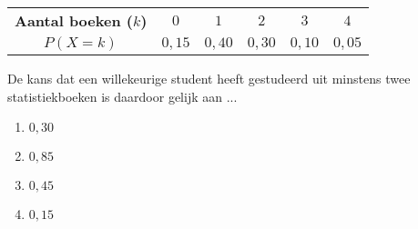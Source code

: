 
\begin{center}
    \begin{tabular}{cccccc}
        \toprule
            {\bfseries Aantal boeken ($k$)} & $0$ & $1$ & $2$ & $3$ & $4$ \\
        \cmidrule{1-1} \cmidrule{2-2} \cmidrule{3-3} \cmidrule{4-4} \cmidrule{5-5} \cmidrule{6-6} 
            $P(X=k)$ & $0,15$ & $0,40$ & $0,30$ & $0,10$ & $0,05$ \\
        \bottomrule
    \end{tabular}
\end{center}


De kans dat een willekeurige student heeft gestudeerd uit minstens twee statistiekboeken is daardoor gelijk aan ...
\begin{enumerate}[label=(\alph*)]
    \item $0,30$
    \item $0,85$
    \item $0,45$
    \item $0,15$
\end{enumerate}
